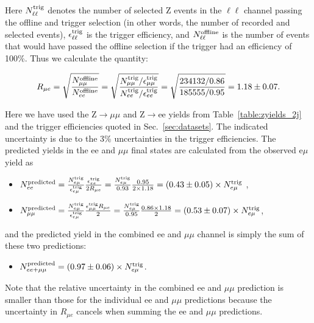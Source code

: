 Here $N_{\ell\ell}^{\rm{trig}}$ denotes the number of selected Z events in the $\ell\ell$ channel passing the offline and trigger selection
(in other words, the number of recorded and selected events), $\epsilon_{\ell\ell}^{\rm{trig}}$ is the trigger efficiency, and 
$N_{\ell\ell}^{\rm{offline}}$ is the number of events that would have passed the offline selection if the trigger had an efficiency of 100\%.
Thus we calculate the quantity:

\begin{equation}
R_{\mu e} = \sqrt{\frac{N_{\mu\mu}^{\rm{offline}}}{N_{ee}^{\rm{offline}}}} = \sqrt{\frac{N_{\mu\mu}^{\rm{trig}}/\epsilon_{\mu\mu}^{\rm{trig}}}{N_{ee}^{\rm{trig}}/\epsilon_{ee}^{\rm{trig}}}} 
= \sqrt{\frac{234132/0.86}{185555/0.95}} = 1.18\pm0.07.
\end{equation}

Here we have used the Z$\to\mu\mu$ and Z$\to$ee yields from Table~\ref{table:zyields_2j} and the trigger efficiencies quoted in Sec.~\ref{sec:datasets}.
The indicated uncertainty is due to the 3\% uncertainties in the trigger efficiencies. %
The predicted yields in the ee and $\mu\mu$ final states are calculated from the observed e$\mu$ yield as

\begin{itemize}
\item $N_{ee}^{\rm{predicted}}    = \frac {N_{e\mu}^{\rm{trig}}} {\epsilon_{e\mu}^{\rm{trig}}} \frac {\epsilon_{ee}^{\rm{trig}}} {2 R_{\mu e}} 
= \frac{N_{e\mu}^{\rm{trig}}}{0.93}\frac{0.95}{2\times1.18} = (0.43\pm0.05) \times N_{e\mu}^{\rm{trig}}$ ,
\item $N_{\mu\mu}^{\rm{predicted}} = \frac {N_{e\mu}^{\rm{trig}}} {\epsilon_{e\mu}^{\rm{trig}}} \frac {\epsilon_{\mu\mu}^{\rm{trig}} R_{\mu e}}  {2}
= \frac {N_{e\mu}^{\rm{trig}}} {0.95} \frac {0.86 \times 1.18}{2} = (0.53\pm0.07) \times N_{e\mu}^{\rm{trig}}$,
\end{itemize}

and the predicted yield in the combined ee and $\mu\mu$ channel is simply the sum of these two predictions:

\begin{itemize}
\item $N_{ee+\mu\mu}^{\rm{predicted}} = (0.97\pm0.06)\times N_{e\mu}^{\rm{trig}}$.
\end{itemize}

Note that the relative uncertainty in the combined ee and $\mu\mu$ prediction is smaller than those for the individual ee and $\mu\mu$ predictions
because the uncertainty in $R_{\mu e}$ cancels when summing the ee and $\mu\mu$ predictions. %

